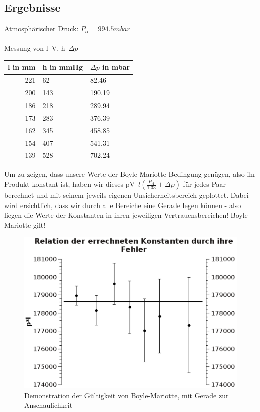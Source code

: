 \documentclass{article}
\begin{document}
\subsection{Ergebnisse}
Atmosphärischer Druck: $P_a=994.5mbar$\\
\\
Messung von l~V, h~$\Delta p$
\begin{center}
\begin{tabular}{r|l|l}
l in mm & h in mmHg & $\Delta p$ in mbar\\
\hline
221 & 62 & 82.46\\
200 & 143 & 190.19\\
186 & 218 & 289.94\\
173 & 283 & 376.39\\
162 & 345 & 458.85\\
154 & 407 & 541.31\\
139 & 528 & 702.24\\
\end{tabular}
\end{center}
Um zu zeigen, dass unsere Werte der Boyle-Mariotte Bedingung genügen, also ihr Produkt konstant ist, haben wir dieses pV~$l(\frac{P_A}{1.33}+\Delta p)$ für jedes Paar berechnet und mit seinem jeweils eigenen Unsicherheitsbereich geplottet. Dabei wird ersichtlich, dass wir durch alle Bereiche eine Gerade legen können - also liegen die Werte der Konstanten in ihren jeweiligen Vertrauensbereichen! Boyle-Mariotte gilt!\\
\begin{center}
\begin{figure}
\caption{Demonstration der Gültigkeit von Boyle-Mariotte, mit Gerade zur Anschaulichkeit}
\includegraphics[scale=0.7]{Graph1.eps}
\end{figure}
\end{center}
\end{document}
